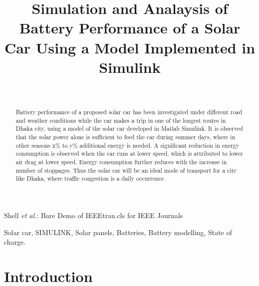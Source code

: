 \documentclass[journal]{IEEEtran/IEEEtran}
\begin{document}
	
	\title{Simulation and Analaysis of Battery Performance of a Solar Car Using a Model Implemented in Simulink}
	
	\author{\\
		
	}
	
	{Shell \MakeLowercase{\textit{et al.}}: Bare Demo of IEEEtran.cls for IEEE Journals}
	
	\maketitle
	
	\begin{abstract}
		Battery performance of a proposed solar car has been investigated under different road and weather conditions while the car makes a trip in one of the longest routes in Dhaka city, using a model of the solar car developed in Matlab Simulink. It is observed that the solar power alone is sufficient to feed the car during summer days, where in other seasons x\% to y\% additional energy is needed. A significant reduction in energy consumption is observed when the car runs at lower speed, which is attributed to lower air drag at lower speed. Energy consumption further reduces with the increase in number of stoppages. Thus the solar car will be an ideal mode of transport for a city like Dhaka, where traffic congestion is a daily occurrence.
	\end{abstract}
	
	\begin{IEEEkeywords}
		Solar car, SIMULINK, Solar panels, Batteries, Battery modelling, State of charge.
	\end{IEEEkeywords}
	
	\IEEEpeerreviewmaketitle
	
	\section{Introduction}
	
\end{document}
